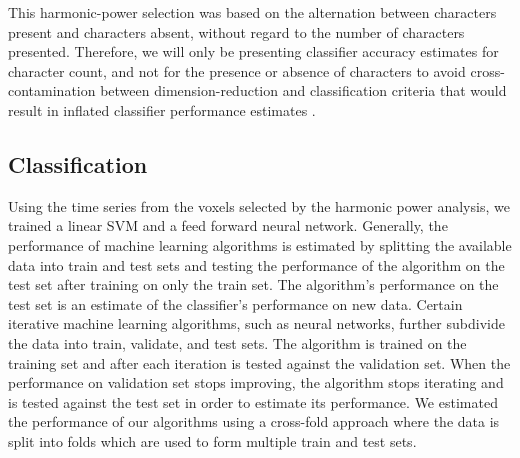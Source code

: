 \documentclass[preprint,authoryear,12pt]{elsarticle}
\begin{document}
This harmonic-power selection was based on the alternation between characters present and characters absent, without regard to the number of characters presented. 
Therefore, we will only be presenting classifier accuracy estimates for character count, and not for the presence or absence of characters to avoid cross-contamination between dimension-reduction and  classification criteria that would result in inflated classifier performance estimates \citep{CrossContamination}.

\subsection{Classification}
Using the time series from the voxels selected by the harmonic power analysis, we trained a linear SVM and a feed forward neural network.
Generally, the performance of machine learning algorithms is estimated by splitting the available data into train and test sets and testing the performance of the algorithm on the test set after training on only the train set.
The algorithm's performance on the test set is an estimate of the classifier's performance on new data.
Certain iterative machine learning algorithms, such as neural networks, further subdivide the data into train, validate, and test sets.
The algorithm is trained on the training set and after each iteration is tested against the validation set.
When the performance on validation set stops improving, the algorithm stops iterating and is tested against the test set in order to estimate its performance.
We estimated the performance of our algorithms using a cross-fold approach \citep{Kohavi1995} where the data is split into folds which are used to form multiple train and test sets.
\end{document}
